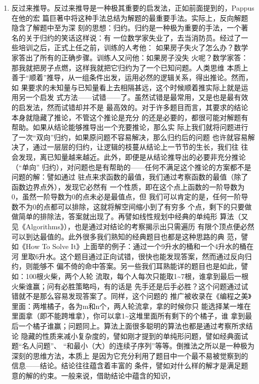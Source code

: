 \documentclass[11pt]{article}
\begin{document}
\begin{itemize}
\begin{enumerate}
\item 反过来推导。反过来推导是一种极其重要的启发法，正如前面提到的，Pappus在他的宏
篇巨著中将这种手法总结为解题的最重要手法。实际上，反向解题隐含了解题中至为深
刻的思想：归约。归约是一种极为重要的手法，一个著名的关于归约的笑话这样说：有
一位数学家失业了，去当消防员。经过了一些培训之后，正式上任之前，训练的人考他：
如果房子失火了怎么办？数学家答出了所有的正确步骤。训练人又问他：如果房子没失
火呢？数学家答：那我就把房子点燃，这样我就把它归约为了一个已知问题。人类思维
本质上善于“顺着”推导，从一组条件出发，运用必然的逻辑关系，得出推论。然而，如
果要求的未知量与已知量看上去相隔甚远，这个时候顺着推实际上就是运用另一个启发
式方法——试错——了。虽然试错是最常用，又是也是最有效的启发法，然而试错却并不是
最高效的。对于许多题目而言，其要求的结论本身就隐藏了推论，不管这个推论是充分
的还是必要的，都很可能对解题有帮助。如果从结论能够推导出一个充要推论，那么实
际上我们就将问题进行了一次“双向”归约，如果原问题不容易解决，那么归约后的问题
也许就容易解决了，通过一层层的归约，让逻辑的枝蔓从结论上一节节的生长，我们往
往会发现，离已知量越来越近。此外，即便是从结论推导出的必要非充分推论（“单向”
归约），对问题也是有帮助的——任何不满足这个推论的方案都不是问题的解：譬如通过
驻点来求函数的最值，我们通过考察函数的最值（除了函数边界点外），发现它必然有
一个性质，即在这个点上函数的一阶导数为0，虽然一阶导数为0的点未必是最值点，但
我们可以肯定的是，任何一阶导数不为0的点都可以排除，这就将解空间缩小到了有穷多
个点，剩下的只要做做简单的排除法，答案就出现了。再譬如线性规划中经典的单纯形
算法（又见《Algorithms》），也是通过对结论的考察揭示出只需遍历
有限个顶点便必然可以到达最值的。此外很多我们熟知的经典题目也都是这种思路的典
范，譬如《How To Solve It》上面举的例子：通过一个9升水的桶和一个4升水的桶在河
里取6升水。这个题目通过正向试错，很快也能发现答案，然而通过反向归约，则能够不
偏不倚的命中答案。另一些我们耳熟能详的题目也是如此，譬如：100根火柴，两个人轮
流取，每个人每次只能取1\textasciitilde{}7根，谁拿到最后一根火柴谁赢；问有必胜策略吗，有的话是
先手还是后手必胜？这个问题通过试错就不是那么容易发现答案了。同样，这个问题的
推广被收录在《编程之美》里面：两堆橘子，各为m和n个，两人轮流拿，拿的时候你只
能选择某一堆在里面拿（即不能跨堆拿），你可以拿1\textasciitilde{}这堆里面所有剩下的个橘子，谁
拿到最后一个橘子谁赢；问题同上。算法上面很多聪明的算法也都是通过考察所求结论
隐藏的性质来减小复杂度的，譬如刚才提到的单纯形问题，譬如经典面试题“名人问题”、
“和最小（大）的连续子序列”等等。倒推法之所以是一种极为深刻的思维方法，本质上
是因为它充分利用了题目中一个最不易被觉察到的信息——结论。结论往往蕴含着丰富的
条件，譬如对什么样的解才是满足题意的解的约束。一般来说，借助结论中蕴含的知识，

\end{enumerate}
\end{itemize}
\end{document}
